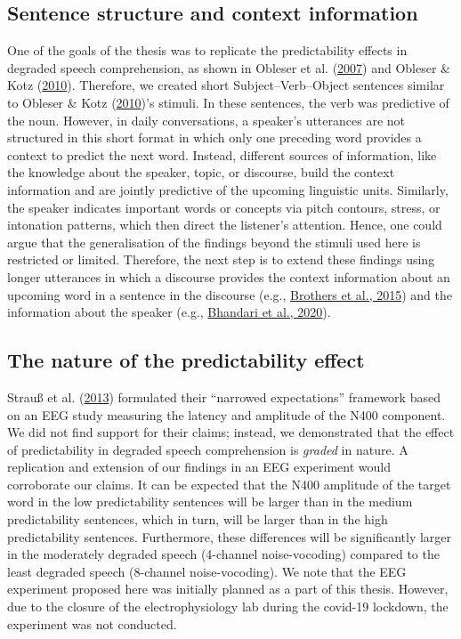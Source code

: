 \documentclass[a4paper, nobind]{templates/ociamthesis}
\begin{document}
\hypertarget{sentence-structure-and-context-information}{%
\subsection{Sentence structure and context information}\label{sentence-structure-and-context-information}}

One of the goals of the thesis was to replicate the predictability effects in degraded speech comprehension, as shown in Obleser et al. (\protect\hyperlink{ref-Obleser2007}{2007}) and Obleser \& Kotz (\protect\hyperlink{ref-Obleser2010}{2010}).
Therefore, we created short Subject--Verb--Object sentences similar to Obleser \& Kotz (\protect\hyperlink{ref-Obleser2010}{2010})'s stimuli.
In these sentences, the verb was predictive of the noun.
However, in daily conversations, a speaker's utterances are not structured in this short format in which only one preceding word provides a context to predict the next word.
Instead, different sources of information, like the knowledge about the speaker, topic, or discourse, build the context information and are jointly predictive of the upcoming linguistic units.
Similarly, the speaker indicates important words or concepts via pitch contours, stress, or intonation patterns,
which then direct the listener's attention.
Hence, one could argue that the generalisation of the findings beyond the stimuli used here is restricted or limited.
Therefore, the next step is to extend these findings using longer utterances in which a discourse provides the context information about an upcoming word in a sentence in the discourse (e.g., \protect\hyperlink{ref-Brothers2015}{Brothers et al., 2015})
and the information about the speaker (e.g., \protect\hyperlink{ref-Bhandari2020}{Bhandari et al., 2020}).

\hypertarget{the-nature-of-the-predictability-effect}{%
\subsection{The nature of the predictability effect}\label{the-nature-of-the-predictability-effect}}

Strauß et al. (\protect\hyperlink{ref-Strauss2013}{2013}) formulated their ``narrowed expectations'' framework based on an EEG study measuring the latency and amplitude of the N400 component.
We did not find support for their claims;
instead, we demonstrated that the effect of predictability in degraded speech comprehension is \emph{graded} in nature.
A replication and extension of our findings in an EEG experiment would corroborate our claims.
It can be expected that the N400 amplitude of the target word in the low predictability sentences will be larger than in the medium predictability sentences, which in turn, will be larger than in the high predictability sentences.
Furthermore, these differences will be significantly larger in the moderately degraded speech (4-channel noise-vocoding) compared to the least degraded speech (8-channel noise-vocoding).
We note that the EEG experiment proposed here was initially planned as a part of this thesis.
However, due to the closure of the electrophysiology lab during the covid-19 lockdown, the experiment was not conducted.
\end{document}
